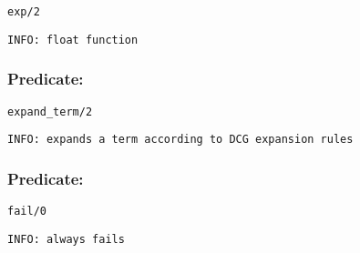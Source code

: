 \begin{verbatim}
exp/2
\end{verbatim}

{\small \begin{verbatim}
INFO: float function

\end{verbatim}}

\subsubsection{Predicate:} \label{expandV95WtermV95W2}

\begin{verbatim}
expand_term/2
\end{verbatim}

{\small \begin{verbatim}
INFO: expands a term according to DCG expansion rules

\end{verbatim}}

\subsubsection{Predicate:} \label{failV95W0}

\begin{verbatim}
fail/0
\end{verbatim}

{\small \begin{verbatim}
INFO: always fails

\end{verbatim}}
